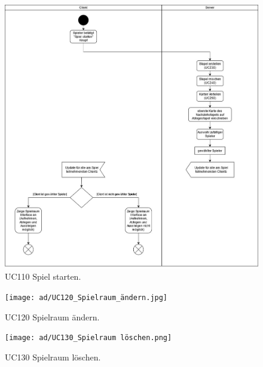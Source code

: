 \begin{figure}[h]
	\centering
	\includegraphics[width=\textwidth]{ad/UC110_Spiel_starten.jpg}
	\caption{UC110 Spiel starten.}
\end{figure}

\begin{figure}[h]
	\centering
	\texttt{[image: ad/UC120\_Spielraum\_ändern.jpg]}
	\caption{UC120 Spielraum ändern.}
\end{figure}

\begin{figure}[h]
	\centering
	\texttt{[image: ad/UC130\_Spielraum löschen.png]}
	\caption{UC130 Spielraum löschen.}
\end{figure}


